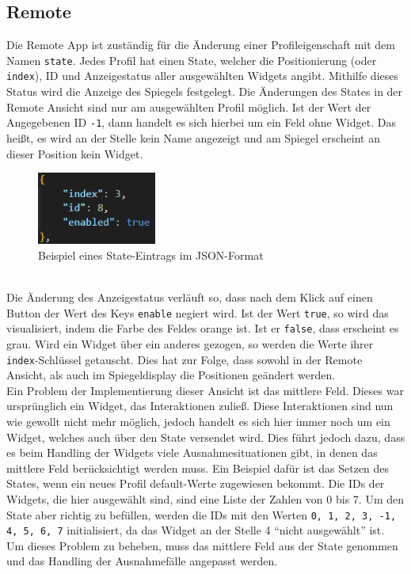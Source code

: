 \subsection{Remote}
Die Remote App ist zuständig für die Änderung einer Profileigenschaft mit dem Namen \texttt{state}. Jedes Profil hat einen State, welcher die Positionierung (oder \texttt{index}), ID und Anzeigestatus aller ausgewählten Widgets angibt. Mithilfe dieses Status wird die Anzeige des Spiegels festgelegt. Die Änderungen des States in der Remote Ansicht sind nur am ausgewählten Profil möglich. Ist der Wert der Angegebenen ID \texttt{-1}, dann handelt es sich hierbei um ein Feld ohne Widget. Das heißt, es wird an der Stelle kein Name angezeigt und am Spiegel erscheint an dieser Position kein Widget.
\begin{figure}[h]
    \centering
    \includegraphics[width=0.35\textwidth]{pictures/remote_state.png}
    \captionsetup{justification=centering, labelformat=simple, singlelinecheck=false}
    \caption{Beispiel eines State-Eintrags im JSON-Format}
    \label{fig:remote_state}
\end{figure} \\
Die Änderung des Anzeigestatus verläuft so, dass nach dem Klick auf einen Button der Wert des Keys \texttt{enable} negiert wird. Ist der Wert \texttt{true}, so wird das visualisiert, indem die Farbe des Feldes orange ist. Ist er \texttt{false}, dass erscheint es grau. Wird ein Widget über ein anderes gezogen, so werden die Werte ihrer \texttt{index}-Schlüssel getauscht. Dies hat zur Folge, dass sowohl in der Remote Ansicht, als auch im Spiegeldisplay die Positionen geändert werden. \\
Ein Problem der Implementierung dieser Ansicht ist das mittlere Feld. Dieses war ursprünglich ein Widget, das Interaktionen zuließ. Diese Interaktionen sind nun wie gewollt nicht mehr möglich, jedoch handelt es sich hier immer noch um ein Widget, welches auch über den State versendet wird. Dies führt jedoch dazu, dass es beim Handling der Widgets viele Ausnahmesituationen gibt, in denen das mittlere Feld berücksichtigt werden muss. Ein Beispiel dafür ist das Setzen des States, wenn ein neues Profil default-Werte zugewiesen bekommt. Die IDs der Widgets, die hier ausgewählt sind, sind eine Liste der Zahlen von 0 bis 7. Um den State aber richtig zu befüllen, werden die IDs mit den Werten \texttt{0, 1, 2, 3, -1, 4, 5, 6, 7} initialisiert, da das Widget an der Stelle 4 \enquote{nicht ausgewählt} ist. Um dieses Problem zu beheben, muss das mittlere Feld aus der State genommen und das Handling der Ausnahmefälle angepasst werden.


